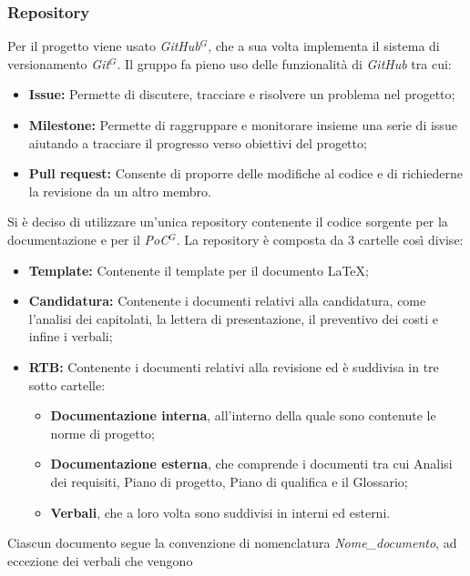 \subsubsection{Repository}
    Per il progetto viene usato \emph{GitHub}$^{G}$, che a sua volta implementa il sistema di versionamento
    \emph{Git}$^{G}$. Il gruppo fa pieno uso delle funzionalità di \emph{GitHub} tra cui:
    \begin{itemize}
        \item \textbf{Issue:} Permette di discutere, tracciare e risolvere un problema nel progetto;
        \item \textbf{Milestone:} Permette di raggruppare e monitorare insieme una serie di issue aiutando a tracciare il progresso verso obiettivi del progetto;
        \item \textbf{Pull request:} Consente di proporre delle modifiche al codice e di richiederne la revisione da un altro membro.
    \end{itemize}
    Si è deciso di utilizzare un'unica repository contenente il codice sorgente per la documentazione e per il \emph{PoC}$^{G}$.
    La repository è composta da 3 cartelle così divise:
    \begin{itemize}
        \item \textbf{Template:} Contenente il template per il documento \LaTeX;
        \item \textbf{Candidatura:} Contenente i documenti relativi alla candidatura, come l'analisi dei capitolati, la lettera di presentazione, il preventivo dei costi e infine i verbali;
        \item \textbf{RTB:} Contenente i documenti relativi alla revisione ed è suddivisa in tre sotto cartelle:
        \begin{itemize}
            \item \textbf{Documentazione interna}, all'interno della quale sono contenute le norme di progetto;
            \item \textbf{Documentazione esterna}, che comprende i documenti tra cui Analisi dei requisiti, Piano di progetto, Piano di qualifica e il Glossario;
            \item \textbf{Verbali}, che a loro volta sono suddivisi in interni ed esterni.
        \end{itemize}
    \end{itemize}
    Ciascun documento segue la convenzione di nomenclatura \emph{Nome\_documento}, ad eccezione dei verbali che vengono
